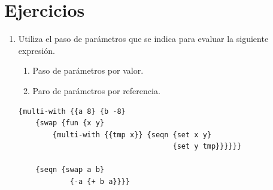 \documentclass[11pt]{article}
\begin{document}
\section*{Ejercicios}

\begin{enumerate}[leftmargin=0.8cm]
    \item Utiliza el paso de parámetros que se indica para evaluar la siguiente expresión.\\
    \begin{enumerate}
        \item Paso de parámetros por valor.
        \item Paro de parámetros por referencia.\\
    \end{enumerate}
    \begin{lstlisting}
{multi-with {{a 8} {b -8}
    {swap {fun {x y}
        {multi-with {{tmp x}} {seqn {set x y} 
                                    {set y tmp}}}}}}
    
    {seqn {swap a b}
            {-a {+ b a}}}}
    \end{lstlisting}


\end{enumerate}
\end{document}
